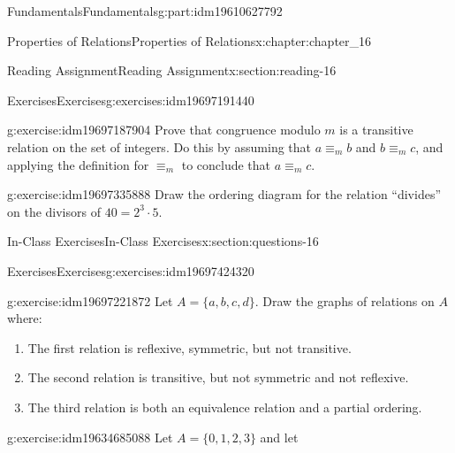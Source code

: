 \documentclass[oneside,10pt,]{book}
\numberwithin{equation}{section}
\begin{document}
\begin{partptx}{Fundamentals}{}{Fundamentals}{}{}{g:part:idm19610627792}
\begin{chapterptx}{Properties of Relations}{}{Properties of Relations}{}{}{x:chapter:chapter_16}
\begin{sectionptx}{Reading Assignment}{}{Reading Assignment}{}{}{x:section:reading-16}
\begin{exercises-subsection-numberless}{Exercises}{}{Exercises}{}{}{g:exercises:idm19697191440}
\par\medskip\noindent%
%
\begin{exercisegroup}
\begin{divisionexerciseeg}{1}{}{}{g:exercise:idm19697187904}%
Prove that congruence modulo \(m\) is a transitive relation on the set of integers. Do this by assuming that \(a \equiv_m b \) and \(b\equiv_m c\), and applying the definition for \(\equiv_m\) to conclude that \(a \equiv_m c\).%
\end{divisionexerciseeg}%
\begin{divisionexerciseeg}{2}{}{}{g:exercise:idm19697335888}%
Draw the ordering diagram for the relation ``divides'' on the divisors of \(40=2^3 \cdot 5\).%
\end{divisionexerciseeg}%
\end{exercisegroup}
\par\medskip\noindent
\end{exercises-subsection-numberless}
\end{sectionptx}
%
%
\typeout{************************************************}
\typeout{************************************************}
%
\begin{sectionptx}{In-Class Exercises}{}{In-Class Exercises}{}{}{x:section:questions-16}
%
%
%
\typeout{************************************************}
\typeout{************************************************}
%
\begin{exercises-subsection-numberless}{Exercises}{}{Exercises}{}{}{g:exercises:idm19697424320}
\par\medskip\noindent%
%
\begin{exercisegroup}
\begin{divisionexerciseeg}{1}{}{}{g:exercise:idm19697221872}%
Let \(A = \{a, b, c, d\}\). Draw the graphs of relations on \(A\) where:%
\begin{enumerate}[label=(\alph*)]
\item{}The first relation is  reflexive, symmetric, but not transitive.%
\item{}The second relation is transitive, but not symmetric and not reflexive.%
\item{}The third relation is both an equivalence relation and a partial ordering.%
\end{enumerate}
%
\end{divisionexerciseeg}%
\begin{divisionexerciseeg}{2}{}{}{g:exercise:idm19634685088}%
Let \(A = \{0, 1, 2, 3\}\) and let%

\end{divisionexerciseeg}
\end{exercisegroup}
\end{exercises-subsection-numberless}
\end{sectionptx}
\end{chapterptx}
\end{partptx}
\end{document}
